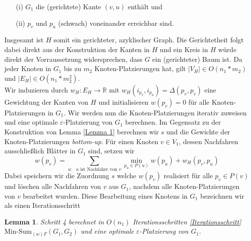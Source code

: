 \documentclass[a4paper, 12pt, twoside]{article}
\theoremstyle{Format1} %
\newtheorem{Lem}[Def]{Lemma}                %
\begin{document}
\begin{enumerate}
	\item[(i)] $G_1$ die (gerichtete) Kante $(v,u)$ enthält und
	\item[(ii)] $p_v$ und $p_u$ (schwach) voneinander erreichbar sind.
\end{enumerate}

Insgesamt ist $H$ somit ein gerichteter, azyklischer Graph. Die Gerichtetheit folgt dabei direkt aus der Konstruktion der Kanten in $H$ und
ein Kreis in $H$ würde direkt der Vorraussetzung widersprechen, dass $G$ ein (gerichteter) Baum ist.
Da jeder Knoten in $G_1$ bis zu $m_2$ Knoten-Platzierungen hat, gilt $|V_H| \in O(n_1*m_2)$ und $|E_H| \in O(n_1*m_2^2)$.
\\
Wir induzieren durch $w_H: E_H \to \mathbb{R}$ mit $w_H(i_{p_v},i_{p_u}) = \Delta(p_v,p_v)$ eine Gewichtung der Kanten von $H$ und
initialisieren $w(p_v) = 0$ für alle Knoten-Platzierungen in $G_1$.
Wir werden nun die Knoten-Platzierungen iterativ zuweisen und eine optimale $\varepsilon$-Platzierung von $G_1$ berechnen.
Im Gegensatz zu der Konstruktion von Lemma \ref{Lemma 1} berechnen wir $s$ und die Gewichte der Knoten-Platzierungen \textit{bottom-up}.
Für einen Knoten $v \in V_1$, dessen Nachfahren ausschließlich Blätter in $G_1$ sind, setzen wir
\begin{equation}
	w(p_v) = \sum_{\text{$u:$ $u$ ist Nachfahre von $v$}} \min_{p_u \in P(u)} w(p_u) + w_H(p_v,p_u) \label{optimal placements}
\end{equation}
Dabei speichern wir die Zuordnung $s$ welche $w(p_v)$ realisiert für alle $p_v \in P(v)$ und löschen alle Nachfahren von $v$ aus $G_1$,
nachdem alle Knoten-Platzierungen von $v$ bearbeitet wurden.
Diese Bearbeitung eines Knotens in $G_1$ bezeichnen wir als einen Iterationsschritt \label{Iterationsschritt}

\begin{Lem} \label{Lemma 2}
	Schritt 4 berechnet in $O(n_1)$ Iterationsschritten \ref{Iterationsschritt} $\text{Min-Sum}_{(w)F}(G_1,G_2)$ und
	eine optimale $\varepsilon$-Platzierung von $G_1$.
\end{Lem}
\end{document}
